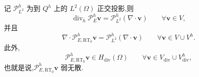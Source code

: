 \begin{lemma}[投影算子的散度]\label{lem:stokes-cr-projection-divergence}
记 $\mathcal{P}_{L^2}^h$ 为到 $Q^h$ 上的 $L^2(\Omega)$ 正交投影,则
\begin{equation}\label{eq:stokes-cr-projection-divergence-cr}
  \operatorname{div}_h\mathcal{P}_E^h\bm{v}
  =\mathcal{P}_{L^2}^h(\nabla\cdot\bm{v})
  \qquad\forall\bm{v}\in V,
\end{equation}
并且
\begin{equation}\label{eq:stokes-cr-projection-divergence-rt0}
  \nabla\cdot\mathcal{P}_{E,\mathrm{RT}_0}^h\bm{v}
  =\mathcal{P}_{L^2}^h(\nabla\cdot\bm{v})
  \qquad\forall\bm{v}\in V\cup V^h.
\end{equation}
此外,
\begin{equation}\label{eq:stokes-cr-projection-hdiv}
  \mathcal{P}_{E,\mathrm{RT}_0}^h\bm{v}\in H_{\mathrm{div}}(\Omega)
  \qquad\forall\bm{v}\in V_{\mathrm{div}}\cup V_{\mathrm{div}}^h,
\end{equation}
也就是说,$\mathcal{P}_{E,\mathrm{RT}_0}^h\bm{v}$ 弱无散.
\end{lemma}
